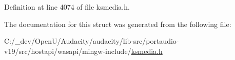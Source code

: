 Definition at line 4074 of file ksmedia.\+h.



The documentation for this struct was generated from the following file\+:\begin{DoxyCompactItemize}
\item 
C\+:/\+\_\+dev/\+Open\+U/\+Audacity/audacity/lib-\/src/portaudio-\/v19/src/hostapi/wasapi/mingw-\/include/\hyperlink{ksmedia_8h}{ksmedia.\+h}\end{DoxyCompactItemize}
